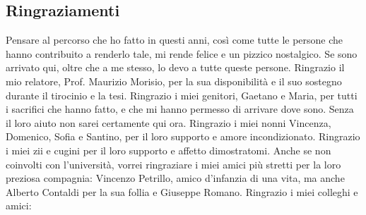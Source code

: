 \newpage
\pagestyle{empty}
\begin{spacing}{\myspacing}
\section*{Ringraziamenti}

Pensare al percorso che ho fatto in questi anni, così come tutte le persone che hanno contribuito a renderlo tale, mi rende felice e un pizzico nostalgico. Se sono arrivato qui, oltre che a me stesso, lo devo a tutte queste persone.
\vspace{2ex}
\newline \noindent Ringrazio il mio relatore, Prof. Maurizio Morisio, per la sua disponibilità e il suo sostegno durante il tirocinio e la tesi.
\vspace{2ex}
\newline \noindent Ringrazio i miei genitori, Gaetano e Maria, per tutti i sacrifici che hanno fatto, e che mi hanno permesso di arrivare dove sono. Senza il loro aiuto non sarei certamente qui ora.
\vspace{2ex}
\newline \noindent Ringrazio i miei nonni Vincenza, Domenico, Sofia e Santino, per il loro supporto e amore incondizionato.
\vspace{2ex}
\newline \noindent Ringrazio i miei zii e cugini per il loro supporto e affetto dimostratomi. 
\vspace{2ex}
\newline \noindent Anche se non coinvolti con l'università, vorrei ringraziare i miei amici più stretti per la loro preziosa compagnia: Vincenzo Petrillo, amico d'infanzia di una vita, ma anche Alberto Contaldi per la sua follia e Giuseppe Romano.
\vspace{2ex}
\newline \noindent Ringrazio i miei colleghi e amici:


\end{spacing}
